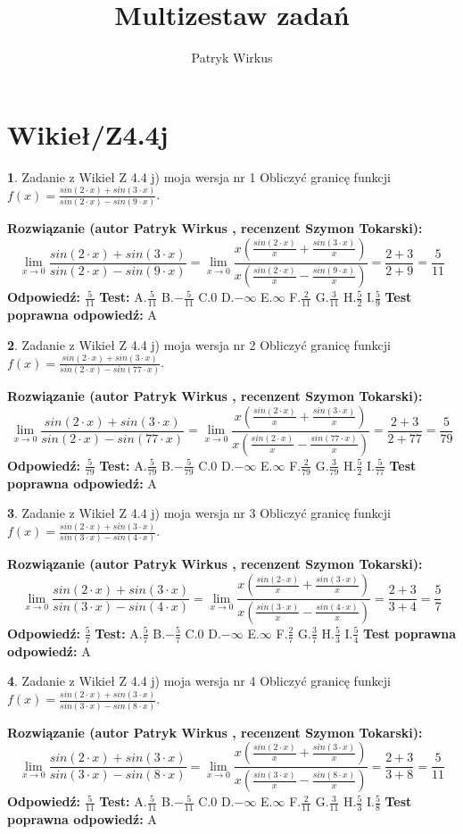 \documentclass[12pt, a4paper]{article}
\title{Multizestaw zadań}
\author{Patryk Wirkus}
\date{}
\theoremstyle{definition} %
\newtheorem{zad}{}
\newcommand{\kategoria}[1]{\section{#1}}
\newcommand{\zadStart}[1]{\begin{zad}#1\newline}
\newcommand{\zadStop}{\end{zad}}
\newcommand{\rozwStart}[2]{\noindent \textbf{Rozwiązanie (autor #1 , recenzent #2): }\newline}
\newcommand{\rozwStop}{\newline}
\newcommand{\odpStart}{\noindent \textbf{Odpowiedź:}\newline}
\newcommand{\odpStop}{\newline}
\newcommand{\testStart}{\noindent \textbf{Test:}\newline}
\newcommand{\testStop}{\newline}
\newcommand{\kluczStart}{\noindent \textbf{Test poprawna odpowiedź:}\newline}
\newcommand{\kluczStop}{\newline}
\begin{document}
\maketitle

\kategoria{Wikieł/Z4.4j}


\zadStart{Zadanie z Wikieł Z 4.4 j) moja wersja nr 1}
Obliczyć granicę funkcji $f(x)=\frac{sin(2\cdot x) +sin(3\cdot x)}{sin(2\cdot x) -sin(9\cdot x)}$.
\zadStop
\rozwStart{Patryk Wirkus}{Szymon Tokarski}
$$\lim\limits_{x\to 0}\frac{sin(2\cdot x) +sin(3\cdot x)}{sin(2\cdot x) -sin(9\cdot x)}=\lim\limits_{x\to 0}\frac{x(\frac{sin(2\cdot x)}{x}+\frac{sin(3\cdot x)}{x})}{x(\frac{sin(2\cdot x)}{x}-\frac{sin(9\cdot x)}{x})}=\frac{2+3}{2+9} = \frac{5}{11}$$
\rozwStop
\odpStart
$\frac{5}{11}$
\odpStop
\testStart
A.$\frac{5}{11}$
B.$-\frac{5}{11}$
C.$0$
D.$-\infty$
E.$\infty$
F.$\frac{2}{11}$
G.$\frac{3}{11}$
H.$\frac{5}{2}$
I.$\frac{5}{9}$
\testStop
\kluczStart
A
\kluczStop



\zadStart{Zadanie z Wikieł Z 4.4 j) moja wersja nr 2}
Obliczyć granicę funkcji $f(x)=\frac{sin(2\cdot x) +sin(3\cdot x)}{sin(2\cdot x) -sin(77\cdot x)}$.
\zadStop
\rozwStart{Patryk Wirkus}{Szymon Tokarski}
$$\lim\limits_{x\to 0}\frac{sin(2\cdot x) +sin(3\cdot x)}{sin(2\cdot x) -sin(77\cdot x)}=\lim\limits_{x\to 0}\frac{x(\frac{sin(2\cdot x)}{x}+\frac{sin(3\cdot x)}{x})}{x(\frac{sin(2\cdot x)}{x}-\frac{sin(77\cdot x)}{x})}=\frac{2+3}{2+77} = \frac{5}{79}$$
\rozwStop
\odpStart
$\frac{5}{79}$
\odpStop
\testStart
A.$\frac{5}{79}$
B.$-\frac{5}{79}$
C.$0$
D.$-\infty$
E.$\infty$
F.$\frac{2}{79}$
G.$\frac{3}{79}$
H.$\frac{5}{2}$
I.$\frac{5}{77}$
\testStop
\kluczStart
A
\kluczStop



\zadStart{Zadanie z Wikieł Z 4.4 j) moja wersja nr 3}
Obliczyć granicę funkcji $f(x)=\frac{sin(2\cdot x) +sin(3\cdot x)}{sin(3\cdot x) -sin(4\cdot x)}$.
\zadStop
\rozwStart{Patryk Wirkus}{Szymon Tokarski}
$$\lim\limits_{x\to 0}\frac{sin(2\cdot x) +sin(3\cdot x)}{sin(3\cdot x) -sin(4\cdot x)}=\lim\limits_{x\to 0}\frac{x(\frac{sin(2\cdot x)}{x}+\frac{sin(3\cdot x)}{x})}{x(\frac{sin(3\cdot x)}{x}-\frac{sin(4\cdot x)}{x})}=\frac{2+3}{3+4} = \frac{5}{7}$$
\rozwStop
\odpStart
$\frac{5}{7}$
\odpStop
\testStart
A.$\frac{5}{7}$
B.$-\frac{5}{7}$
C.$0$
D.$-\infty$
E.$\infty$
F.$\frac{2}{7}$
G.$\frac{3}{7}$
H.$\frac{5}{3}$
I.$\frac{5}{4}$
\testStop
\kluczStart
A
\kluczStop



\zadStart{Zadanie z Wikieł Z 4.4 j) moja wersja nr 4}
Obliczyć granicę funkcji $f(x)=\frac{sin(2\cdot x) +sin(3\cdot x)}{sin(3\cdot x) -sin(8\cdot x)}$.
\zadStop
\rozwStart{Patryk Wirkus}{Szymon Tokarski}
$$\lim\limits_{x\to 0}\frac{sin(2\cdot x) +sin(3\cdot x)}{sin(3\cdot x) -sin(8\cdot x)}=\lim\limits_{x\to 0}\frac{x(\frac{sin(2\cdot x)}{x}+\frac{sin(3\cdot x)}{x})}{x(\frac{sin(3\cdot x)}{x}-\frac{sin(8\cdot x)}{x})}=\frac{2+3}{3+8} = \frac{5}{11}$$
\rozwStop
\odpStart
$\frac{5}{11}$
\odpStop
\testStart
A.$\frac{5}{11}$
B.$-\frac{5}{11}$
C.$0$
D.$-\infty$
E.$\infty$
F.$\frac{2}{11}$
G.$\frac{3}{11}$
H.$\frac{5}{3}$
I.$\frac{5}{8}$
\testStop
\kluczStart
A
\kluczStop
\end{document}

